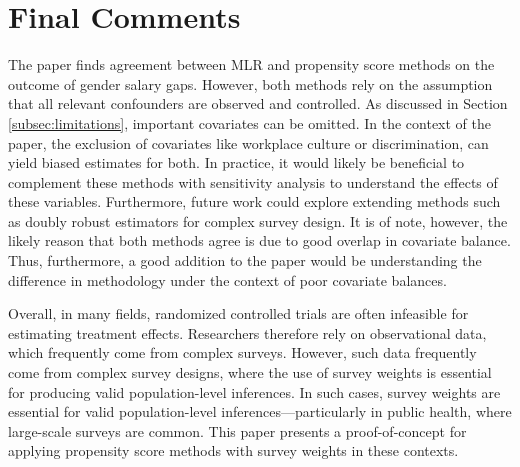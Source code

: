 \documentclass[12pt]{article}
\begin{document}
\section{Final Comments} \label{sec:finalcomments}

The paper finds agreement between MLR and propensity score methods on the outcome of gender salary gaps. However, both methods rely on the assumption that all relevant confounders are observed and controlled. As discussed in Section \ref{subsec:limitations}, important covariates can be omitted. In the context of the paper, the exclusion of covariates like workplace culture or discrimination, can yield biased estimates for both. In practice, it would likely be beneficial to complement these methods with sensitivity analysis to understand the effects of these variables. Furthermore, future work could explore extending methods such as doubly robust estimators for complex survey design. It is of note, however, the likely reason that both methods agree is due to good overlap in covariate balance. Thus, furthermore, a good addition to the paper would be understanding the difference in methodology under the context of poor covariate balances. 

Overall, in many fields, randomized controlled trials are often infeasible for estimating treatment effects. Researchers therefore rely on observational data, which frequently come from complex surveys. However, such data frequently come from complex survey designs, where the use of survey weights is essential for producing valid population-level inferences. In such cases, survey weights are essential for valid population-level inferences—particularly in public health, where large-scale surveys are common. This paper presents a proof-of-concept for applying propensity score methods with survey weights in these contexts.


\end{document}
